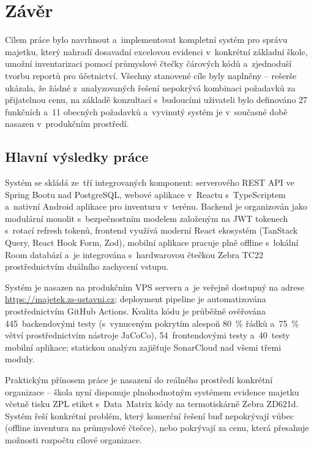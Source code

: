 \chapter{Závěr}\label{chap:conclusion}

Cílem práce bylo navrhnout a~implementovat kompletní systém pro správu majetku, který nahradí dosavadní excelovou evidenci v~konkrétní základní škole, umožní inventarizaci pomocí průmyslové čtečky čárových kódů a~zjednoduší tvorbu reportů pro účetnictví. Všechny stanovené cíle byly naplněny -- rešerše ukázala, že žádné z~analyzovaných řešení nepokrývá kombinaci požadavků za přijatelnou cenu, na základě konzultací s~budoucími uživateli bylo definováno 27 funkčních a~11 obecných požadavků a~vyvinutý systém je v~současné době nasazen v~produkčním prostředí.

\section*{Hlavní výsledky práce}

Systém se skládá ze~tří integrovaných komponent: serverového REST API ve Spring Bootu nad PostgreSQL, webové aplikace v~Reactu s~TypeScriptem a~nativní Android aplikace pro inventuru v~terénu. Backend je organizován jako modulární monolit s~bezpečnostním modelem založeným na JWT tokenech s~rotací refresh tokenů, frontend využívá moderní React ekosystém (TanStack Query, React Hook Form, Zod), mobilní aplikace pracuje plně offline s~lokální Room databází a~je integrována s~hardwarovou čtečkou Zebra TC22 prostřednictvím duálního zachycení vstupu.

Systém je nasazen na produkčním VPS serveru a~je veřejně dostupný na adrese \url{https://majetek.zs-ustavni.cz}; deployment pipeline je automatizována prostřednictvím GitHub Actions. Kvalita kódu je průběžně ověřována 445~backendovými testy (s~vynuceným pokrytím alespoň 80~\% řádků a~75~\% větví prostřednictvím nástroje JaCoCo), 54~frontendovými testy a~40~testy mobilní aplikace; statickou analýzu zajišťuje SonarCloud nad všemi třemi moduly.

Praktickým přínosem práce je nasazení do reálného prostředí konkrétní organizace -- škola nyní disponuje plnohodnotným systémem evidence majetku včetně tisku ZPL etiket s~Data~Matrix kódy na termotiskárně Zebra ZD621d. Systém řeší konkrétní problém, který komerční řešení buď nepokrývají vůbec (offline inventura na průmyslové čtečce), nebo pokrývají za cenu, která přesahuje možnosti rozpočtu cílové organizace.

